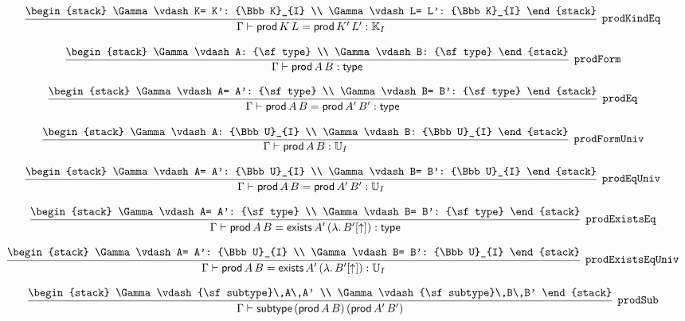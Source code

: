 \[
\infer[{\tt prodKindEq}]{\Gamma \vdash {\sf prod}\,K\,L= {\sf prod}\,K'\,L': {\Bbb K}_{I}}{
\begin{stack}
\Gamma \vdash K= K': {\Bbb K}_{I}
\\
\Gamma \vdash L= L': {\Bbb K}_{I}
\end{stack}}
\]

\[
\infer[{\tt prodForm}]{\Gamma \vdash {\sf prod}\,A\,B: {\sf type}}{
\begin{stack}
\Gamma \vdash A: {\sf type}
\\
\Gamma \vdash B: {\sf type}
\end{stack}}
\]

\[
\infer[{\tt prodEq}]{\Gamma \vdash {\sf prod}\,A\,B= {\sf prod}\,A'\,B': {\sf type}}{
\begin{stack}
\Gamma \vdash A= A': {\sf type}
\\
\Gamma \vdash B= B': {\sf type}
\end{stack}}
\]

\[
\infer[{\tt prodFormUniv}]{\Gamma \vdash {\sf prod}\,A\,B: {\Bbb U}_{I}}{
\begin{stack}
\Gamma \vdash A: {\Bbb U}_{I}
\\
\Gamma \vdash B: {\Bbb U}_{I}
\end{stack}}
\]

\[
\infer[{\tt prodEqUniv}]{\Gamma \vdash {\sf prod}\,A\,B= {\sf prod}\,A'\,B': {\Bbb U}_{I}}{
\begin{stack}
\Gamma \vdash A= A': {\Bbb U}_{I}
\\
\Gamma \vdash B= B': {\Bbb U}_{I}
\end{stack}}
\]

\[
\infer[{\tt prodExistsEq}]{\Gamma \vdash {\sf prod}\,A\,B= {\sf exists}\,A'\,(\lambda .\,B'[\uparrow ]): {\sf type}}{
\begin{stack}
\Gamma \vdash A= A': {\sf type}
\\
\Gamma \vdash B= B': {\sf type}
\end{stack}}
\]

\[
\infer[{\tt prodExistsEqUniv}]{\Gamma \vdash {\sf prod}\,A\,B= {\sf exists}\,A'\,(\lambda .\,B'[\uparrow ]): {\Bbb U}_{I}}{
\begin{stack}
\Gamma \vdash A= A': {\Bbb U}_{I}
\\
\Gamma \vdash B= B': {\Bbb U}_{I}
\end{stack}}
\]

\[
\infer[{\tt prodSub}]{\Gamma \vdash {\sf subtype}\,({\sf prod}\,A\,B)\,({\sf prod}\,A'\,B')}{
\begin{stack}
\Gamma \vdash {\sf subtype}\,A\,A'
\\
\Gamma \vdash {\sf subtype}\,B\,B'
\end{stack}}
\]

